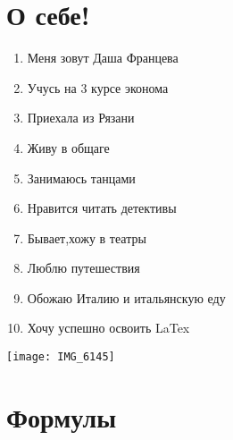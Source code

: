 \documentclass[12pt,a4paper]{article}
\begin{document}
\section{О себе!}
\begin{enumerate}
\item Меня зовут Даша Францева
\item Учусь на 3 курсе эконома
\item Приехала из Рязани
\item Живу в общаге
\item Занимаюсь танцами
\item Нравится читать детективы
\item Бывает,хожу в театры
\item Люблю путешествия
\item Обожаю Италию и итальянскую еду
\item Хочу успешно освоить LaTex
\end{enumerate}
\texttt{[image: IMG\_6145]}
\section{Формулы}
\end{document}
